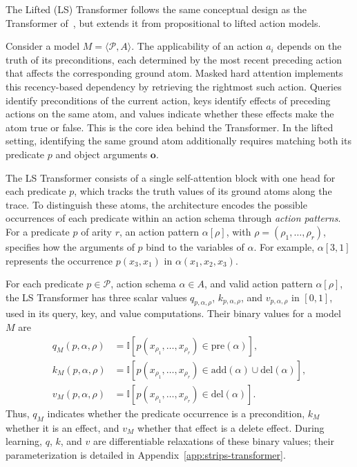 The Lifted \strips (LS) Transformer follows the same conceptual design
as the \strips Transformer of~\citet{nunez2026strips}, but extends it
from propositional to lifted action models.

Consider a \strips model $M=\langle\mathcal{P},A\rangle$. The applicability
of an action $a_i$ depends on the truth of its preconditions, each determined
by the most recent preceding action that affects the corresponding ground
atom. Masked hard attention implements this recency-based dependency by
retrieving the rightmost such action. Queries identify preconditions of the
current action, keys identify effects of preceding actions on the same atom,
and values indicate whether these effects make the atom true or false.
This is the core idea behind the \strips Transformer. In the lifted setting,
identifying the same ground atom additionally requires matching both its
predicate $p$ and object arguments $\mathbf{o}$.

The LS Transformer consists of a single self-attention block with one head
for each predicate $p$, which tracks the truth values of its ground
atoms along the trace. To distinguish these atoms, the architecture encodes the 
possible occurrences of each predicate within an action schema through
\emph{action patterns}. For a predicate $p$ of arity $r$, an action pattern 
$\alpha[\rho]$, with $\rho=(\rho_1,\ldots,\rho_r)$, specifies how the arguments 
of $p$ bind to the variables of $\alpha$. For example, $\alpha[3,1]$ represents 
the occurrence $p(x_3,x_1)$ in $\alpha(x_1,x_2,x_3)$.

For each predicate $p\in\mathcal{P}$, action schema $\alpha\in A$, and valid
action pattern $\alpha[\rho]$, the LS Transformer has three scalar values
$q_{p,\alpha,\rho}$, $k_{p,\alpha,\rho}$, and $v_{p,\alpha,\rho}$ in
$[0,1]$, used in its query, key, and value computations. Their binary
values for a \strips model $M$ are
\begin{align}
q_M(p,\alpha,\rho)
&=
\mathbb{I}\!\left[
p(x_{\rho_1},\ldots,x_{\rho_r})\in\mathrm{pre}(\alpha)
\right],\\
k_M(p,\alpha,\rho)
&=
\mathbb{I}\!\left[
p(x_{\rho_1},\ldots,x_{\rho_r})
\in\mathrm{add}(\alpha)\cup\mathrm{del}(\alpha)
\right],\\
v_M(p,\alpha,\rho)
&=
\mathbb{I}\!\left[
p(x_{\rho_1},\ldots,x_{\rho_r})\in\mathrm{del}(\alpha)
\right].
\end{align}
Thus, $q_M$ indicates whether the predicate occurrence is a precondition,
$k_M$ whether it is an effect, and $v_M$ whether that effect is a delete
effect. During learning, $q$, $k$, and $v$ are differentiable relaxations
of these binary values; their parameterization is detailed in
Appendix~\ref{app:strips-transformer}.

